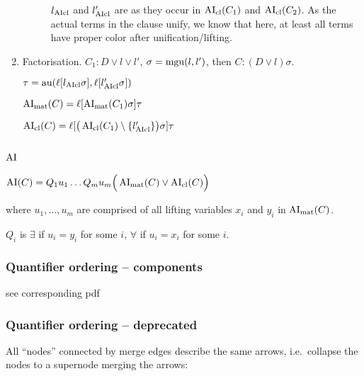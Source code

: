 \documentclass[,%
	paper=a4,%
	DIV14, %
	twoside=false,%
	liststotoc,
	bibtotoc,
	draft=false,%
	numbers=noendperiod
]{scrartcl}
\begin{document}
\begin{enumerate}
\begin{description}
				$l_{\operatorname{AIcl}}$ and $l'_{\operatorname{AIcl}}$ are as they occur in $\operatorname{AI}_\mathrm{cl}(C_1)$ and $\operatorname{AI}_\mathrm{cl}(C_2)$. As the actual terms in the clause unify, we know that here, at least all terms have proper color after unification/lifting.


		\end{description}

	\item Factorisation. $C_1: D \lor l \lor l'$, $\sigma = \operatorname{mgu}(l, l')$, then $C: (D\lor l)\sigma$.

		$\tau = \operatorname{au}(\ell[l_{\operatorname{AIcl}}\sigma], \ell[l'_{\operatorname{AIcl}}\sigma])$

		$\operatorname{AI}_\mathrm{mat}(C) = \ell[\operatorname{AI}_\mathrm{mat}(C_1)\sigma]\tau$

		$\operatorname{AI}_\mathrm{cl}(C) = \ell[ \big(\operatorname{AI}_\mathrm{cl}(C_1) \setminus \{l'_{\operatorname{AIcl}}\}\big)\sigma]\tau$



\end{enumerate}

\subsection{$\operatorname{AI}$}


$\operatorname{AI}(C) = Q_1 u_1 \ldots Q_m u_m \Big( \operatorname{AI}_\mathrm{mat}(C) \lor \operatorname{AI}_\mathrm{cl}(C) \Big)$

where $u_1, \ldots, u_m$ are comprised of all lifting variables $x_i$ and $y_i$ in $\operatorname{AI}_\mathrm{mat}(C)$.


$Q_i$ is $\exists$ if $u_i = y_i$ for some $i$, $\forall$ if $u_i = x_i$ for some $i$.

\subsubsection{Quantifier ordering -- components}
see corresponding pdf

\subsubsection{Quantifier ordering -- deprecated}

All ``nodes'' connected by merge edges describe the same arrows, i.e.~collapse the nodes to a supernode merging the arrows:

\end{document}
